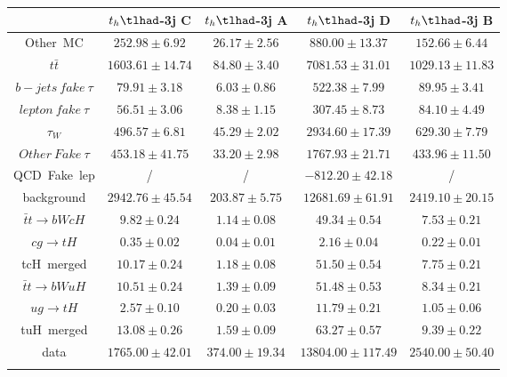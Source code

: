 \begin{tabular}{ccccc} \toprule\toprule
 & $t_{h}\tlhad$-3j C & $t_{h}\tlhad$-3j A & $t_{h}\tlhad$-3j D & $t_{h}\tlhad$-3j B\\\midrule
\hspace{3mm}Other~MC & $252.98\pm6.92$ & $26.17\pm2.56$ & $880.00\pm13.37$ & $152.66\pm6.44$\\
\hspace{3mm}$t\bar{t}$ & $1603.61\pm14.74$ & $84.80\pm3.40$ & $7081.53\pm31.01$ & $1029.13\pm11.83$\\
\hspace{3mm}$b-jets~fake~\tau$ & $79.91\pm3.18$ & $6.03\pm0.86$ & $522.38\pm7.99$ & $89.95\pm3.41$\\
\hspace{3mm}$lepton~fake~\tau$ & $56.51\pm3.06$ & $8.38\pm1.15$ & $307.45\pm8.73$ & $84.10\pm4.49$\\
\hspace{3mm}$\tau_{W}$ & $496.57\pm6.81$ & $45.29\pm2.02$ & $2934.60\pm17.39$ & $629.30\pm7.79$\\
\hspace{3mm}$Other~Fake~\tau$ & $453.18\pm41.75$ & $33.20\pm2.98$ & $1767.93\pm21.71$ & $433.96\pm11.50$\\
\hspace{3mm}QCD~Fake~lep &  / &  / & $-812.20\pm42.18$ &  /\\
background & $2942.76\pm45.54$ & $203.87\pm5.75$ & $12681.69\pm61.91$ & $2419.10\pm20.15$\\\midrule
\hspace{3mm}$\bar{t}t\to bWcH$ & $9.82\pm0.24$ & $1.14\pm0.08$ & $49.34\pm0.54$ & $7.53\pm0.21$\\
\hspace{3mm}$cg\to tH$ & $0.35\pm0.02$ & $0.04\pm0.01$ & $2.16\pm0.04$ & $0.22\pm0.01$\\
tcH~merged & $10.17\pm0.24$ & $1.18\pm0.08$ & $51.50\pm0.54$ & $7.75\pm0.21$\\
\hspace{3mm}$\bar{t}t\to bWuH$ & $10.51\pm0.24$ & $1.39\pm0.09$ & $51.48\pm0.53$ & $8.34\pm0.21$\\
\hspace{3mm}$ug\to tH$ & $2.57\pm0.10$ & $0.20\pm0.03$ & $11.79\pm0.21$ & $1.05\pm0.06$\\
tuH~merged & $13.08\pm0.26$ & $1.59\pm0.09$ & $63.27\pm0.57$ & $9.39\pm0.22$\\\midrule
data & $1765.00\pm42.01$ & $374.00\pm19.34$ & $13804.00\pm117.49$ & $2540.00\pm50.40$\\
\bottomrule\bottomrule\\
\end{tabular}
